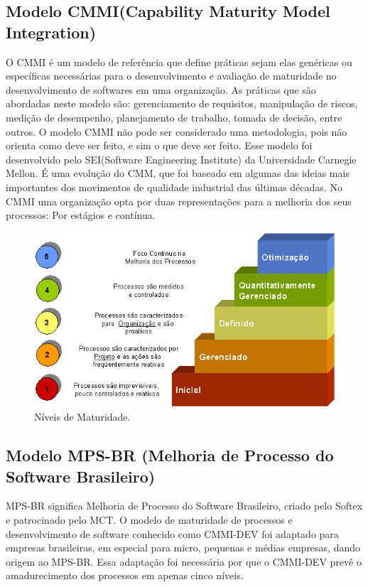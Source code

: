   \subsection{Modelo CMMI(Capability Maturity Model Integration)}
  O CMMI é um modelo de referência que define práticas sejam elas genéricas ou específicas necessárias para o desenvolvimento e avaliação de maturidade no desenvolvimento de softwares em uma organização. As práticas que são abordadas neste modelo são: gerenciamento de requisitos, manipulação de riscos, medição de desempenho, planejamento de trabalho, tomada de decisão, entre outros. O modelo CMMI não pode ser considerado uma metodologia, pois não orienta como deve ser feito, e sim o que deve ser feito. Esse modelo foi desenvolvido pelo SEI(Software Engineering Institute) da Universidade Carnegie Mellon. É uma evolução do CMM, que foi baseado em algumas das ideias mais importantes dos movimentos de qualidade industrial das últimas décadas.
No CMMI uma organização opta por duas representações para a melhoria dos seus processos: Por estágios e contínua.
  \begin{figure}[!htbp]
    \centering
    \includegraphics[scale=0.5]{editaveis/figuras/cinco-niveis-maturidade-cmmi}
    \caption[Níveis de Maturidade]{Níveis de Maturidade. \footnotemark}
    \label{cinco-niveis-maturidade-cmmi}
  \end{figure}

  \subsection{Modelo MPS-BR (Melhoria de Processo do Software Brasileiro)} \label{mps-br}
MPS-BR significa Melhoria de Processo do Software Brasileiro, criado pelo Softex e patrocinado pelo MCT. O modelo de maturidade de processos e desenvolvimento de software conhecido como CMMI-DEV foi adaptado para empresas brasileiras, em especial para micro, pequenas e médias empresas, dando origem ao MPS-BR. Essa adaptação foi necessária por que o CMMI-DEV prevê o amadurecimento dos processos em apenas cinco níveis.

